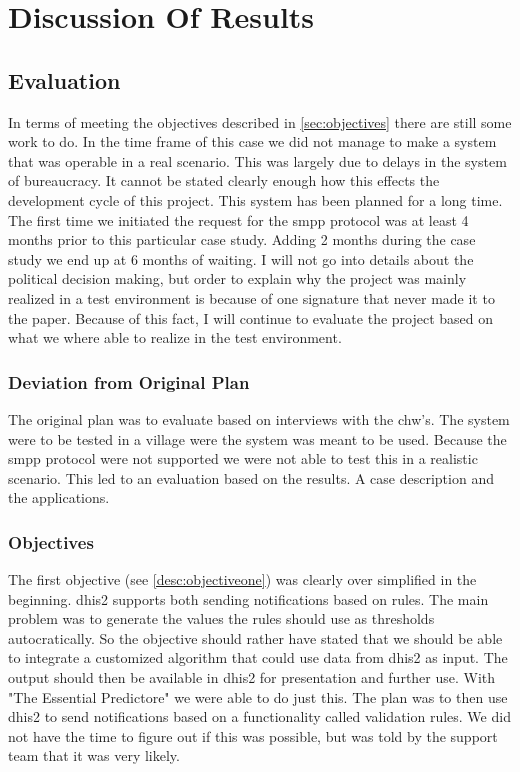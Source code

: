 \chapter{Discussion Of Results}

\section{Evaluation}
In terms of meeting the objectives described in \ref{sec:objectives} there are still some work to do.
In the time frame of this case we did not manage to make a system that was operable in a real scenario. 
This was largely due to delays in the system of bureaucracy. 
It cannot be stated clearly enough how this effects the development cycle of this project.
This system has been planned for a long time. 
The first time we initiated the request for the \gls{smpp} protocol was at least 4 months prior to this particular case study. Adding 2 months during the case study we end up at 6 months of waiting.
I will not go into details about the political decision making, but order to explain why the project was mainly realized in a test environment is because of one signature that never made it to the paper.
Because of this fact, I will continue to evaluate the project based on what we where able to realize in the test environment.

\subsection{Deviation from Original Plan}
The original plan was to evaluate based on interviews with the \gls{chw}'s.
The system were to be tested in a village were the system was meant to be used.
Because the \gls{smpp} protocol were not supported we were not able to test this in a realistic scenario.
This led to an evaluation based on the results. A case description and the applications. 

\subsection{Objectives}
The first objective (see \ref{desc:objectiveone}) was clearly over simplified in the beginning.
\gls{dhis2} supports both sending notifications based on rules. The main problem was to generate the values the rules should use as thresholds autocratically. So the objective should rather have stated that we should be able to integrate a customized algorithm that could use data from \gls{dhis2} as input. The output should then be available in \gls{dhis2} for presentation and further use. 
With "The Essential Predictore" we were able to do just this. The plan was to then use \gls{dhis2} to send notifications based on a functionality called validation rules.
We did not have the time to figure out if this was possible, but was told by the support team that it was very likely. 

